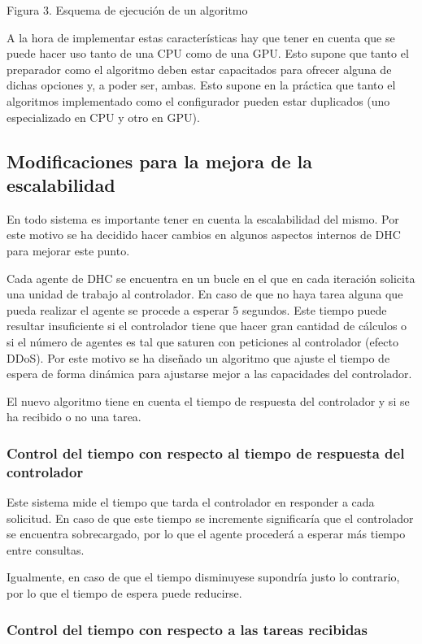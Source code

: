 Figura 3. Esquema de ejecución de un algoritmo

A la hora de implementar estas características hay que tener en cuenta que se puede hacer uso tanto de una CPU como de una GPU. Esto supone que tanto el preparador como el algoritmo deben estar capacitados para ofrecer alguna de dichas opciones y, a poder ser, ambas. Esto supone en la práctica que tanto el algoritmos implementado como el configurador pueden estar duplicados (uno especializado en CPU y otro en GPU).

\subsection{Modificaciones para la mejora de la escalabilidad}

En todo sistema es importante tener en cuenta la escalabilidad del mismo. Por este motivo se ha decidido hacer cambios en algunos aspectos internos de DHC para mejorar este punto.

Cada agente de DHC se encuentra en un bucle en el que en cada iteración solicita una unidad de trabajo al controlador. En caso de que no haya tarea alguna que pueda realizar el agente se procede a esperar 5 segundos. Este tiempo puede resultar insuficiente si el controlador tiene que hacer gran cantidad de cálculos o si el número de agentes es tal que saturen con peticiones al controlador (efecto DDoS). Por este motivo se ha diseñado un algoritmo que ajuste el tiempo de espera de forma dinámica para ajustarse mejor a las capacidades del controlador.

El nuevo algoritmo tiene en cuenta el tiempo de respuesta del controlador y si se ha recibido o no una tarea.

\subsubsection{Control del tiempo con respecto al tiempo de respuesta del controlador}

Este sistema mide el tiempo que tarda el controlador en responder a cada solicitud. En caso de que este tiempo se incremente significaría que el controlador se encuentra sobrecargado, por lo que el agente procederá a esperar más tiempo entre consultas.

Igualmente, en caso de que el tiempo disminuyese supondría justo lo contrario, por lo que el tiempo de espera puede reducirse.

\subsubsection{Control del tiempo con respecto a las tareas recibidas}

